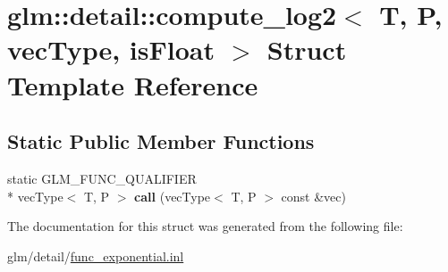 \hypertarget{structglm_1_1detail_1_1compute__log2}{\section{glm\-:\-:detail\-:\-:compute\-\_\-log2$<$ T, P, vec\-Type, is\-Float $>$ Struct Template Reference}
\label{structglm_1_1detail_1_1compute__log2}
}
\subsection*{Static Public Member Functions}
\begin{DoxyCompactItemize}
\item 
\hypertarget{structglm_1_1detail_1_1compute__log2_a5861f27c41f2fe68da0adf5634b54c6d}{static G\-L\-M\-\_\-\-F\-U\-N\-C\-\_\-\-Q\-U\-A\-L\-I\-F\-I\-E\-R \\*
vec\-Type$<$ T, P $>$ {\bfseries call} (vec\-Type$<$ T, P $>$ const \&vec)}\label{structglm_1_1detail_1_1compute__log2_a5861f27c41f2fe68da0adf5634b54c6d}

\end{DoxyCompactItemize}


The documentation for this struct was generated from the following file\-:\begin{DoxyCompactItemize}
\item 
glm/detail/\hyperlink{func__exponential_8inl}{func\-\_\-exponential.\-inl}\end{DoxyCompactItemize}
